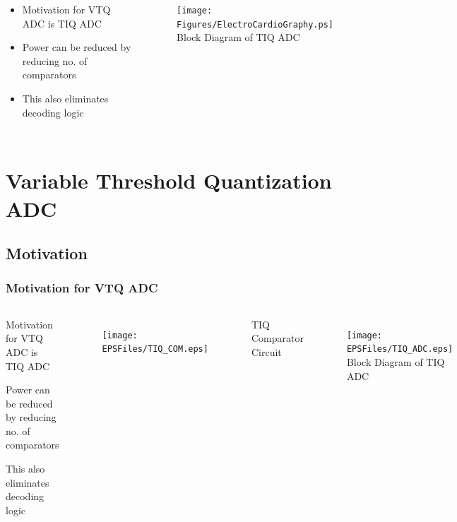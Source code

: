 \begin{columns}[c]
			\column{3.0in}
			\begin{itemize}
				\item{Motivation for VTQ ADC is TIQ ADC}
       				\item{Power can be reduced by reducing no. of comparators}
       				\item{This also eliminates decoding logic}
 			\end{itemize}
			\column{2.0in}
			\begin{figure}
				\begin{center}
					\texttt{[image: Figures/ElectroCardioGraphy.ps]}\\
               				\small{Block Diagram of TIQ ADC}
				\end{center}
			\end{figure}
		\end{columns}











\section{Variable Threshold Quantization ADC}
\subsection*{Motivation}
\begin{frame}
	\frametitle{Motivation for VTQ ADC}
	\begin{center}
		\begin{columns}[c]
		\column{2.5in}
			\begin{itemize}
				\small{\item{Motivation for VTQ ADC is TIQ ADC}
       				\item{Power can be reduced by reducing no. of comparators}
       				\item{This also eliminates decoding logic}}
 			\end{itemize}
				\begin{figure}
					\begin{center}
				\texttt{[image: EPSFiles/TIQ\_COM.eps]}\\
					\end{center}
				\end{figure}
			\begin{center}
			\small{TIQ Comparator Circuit}
			\end{center}
		\column{2.5in}
			\begin{figure}
				\begin{center}
				\texttt{[image: EPSFiles/TIQ\_ADC.eps]}\\
               			\small{Block Diagram of TIQ ADC}
				\end{center}
			\end{figure}
		\end{columns}
	\end{center}	
\end{frame}
